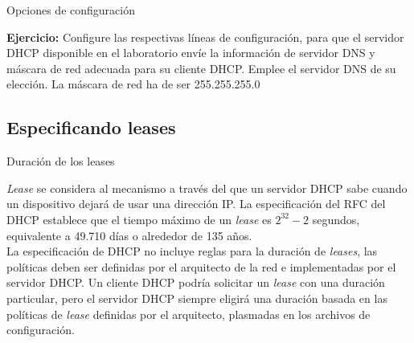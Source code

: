 \begin{frame}{Opciones de configuración}
\framebreak

    \textbf{Ejercicio:} Configure las respectivas líneas de configuración, para
    que el servidor DHCP disponible en el laboratorio envíe la información de
    servidor DNS y máscara de red adecuada para su cliente DHCP. Emplee el
    servidor DNS de su elección. La máscara de red ha de ser
    255.255.255.0\\[0.2cm]

\end{frame}

\subsection{Especificando leases} %
\label{sub:Especificando leases}


\begin{frame}{Duración de los leases}

    \textit{Lease} se considera al mecanismo a través del que un servidor DHCP sabe
    cuando un dispositivo dejará de usar una dirección IP. La especificación
    del RFC del DHCP establece que el tiempo máximo de un \textit{lease} es
    ${2^{32}}-2$ segundos, equivalente a 49.710 días o alrededor de 135
    años.\\[0.2cm]

    La especificación de DHCP no incluye reglas para la duración de
    \textit{leases}, las políticas deben ser definidas por el arquitecto de la
    red e implementadas por el servidor DHCP. Un cliente DHCP podría solicitar
    un \textit{lease} con una duración particular, pero el servidor DHCP
    siempre eligirá una duración basada en las políticas de \textit{lease}
    definidas por el arquitecto, plasmadas en los archivos de configuración.\\[0.2cm]

\end{frame}

